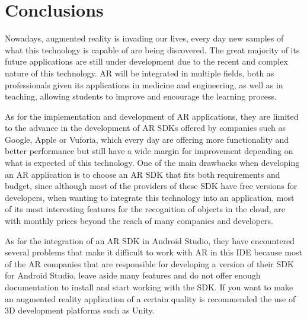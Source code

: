 \section{Conclusions}

Nowadays, augmented reality is invading our lives, every day new samples of what this technology is capable of are being discovered. The great majority of its future applications are still under development due to the recent and complex nature of this technology. AR will be integrated in multiple fields, both as professionals given its applications in medicine and engineering, as well as in teaching, allowing students to improve and encourage the learning process. 

As for the implementation and development of AR applications, they are limited to the advance in the development of AR SDKs offered by companies such as Google, Apple or Vuforia, which every day are offering more functionality and better performance but still have a wide margin for improvement depending on what is expected of this technology. One of the main drawbacks when developing an AR application is to choose an AR SDK that fits both requirements and budget, since although most of the providers of these SDK have free versions for developers, when wanting to integrate this technology into an application, most of its most interesting features for the recognition of objects in the cloud, are with monthly prices beyond the reach of many companies and developers.

As for the integration of an AR SDK in Android Studio, they have encountered several problems that make it difficult to work with AR in this IDE because most of the AR companies that are responsible for developing a version of their SDK for Android Studio, leave aside many features and do not offer enough documentation to install and start working with the SDK. If you want to make an augmented reality application of a certain quality is recommended the use of 3D development platforms such as Unity.



